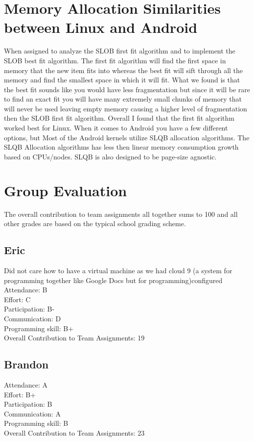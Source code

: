 \documentclass[letterpaper,10pt]{article}
\begin{document}
\section{Memory Allocation Similarities between Linux and Android}
When assigned to analyze the SLOB first fit algorithm and to implement the SLOB best fit algorithm. The first fit algorithm will find the first space in memory that the new item fits into whereas the best fit will sift through all the memory and find the smallest space in which it will fit. What we found is that the best fit sounds like you would have less fragmentation but since it will be rare to find an exact fit you will have many extremely small chunks of memory that will never be used leaving empty memory causing a higher level of fragmentation then the SLOB first fit algorithm. Overall I found that the first fit algorithm worked best for Linux. When it comes to Android you have a few different options, but Most of the Android kernels utilize SLQB allocation algorithms. The SLQB Allocation algorithms has less then linear memory consumption growth based on CPUs/nodes. SLQB is also designed to be page-size agnostic.

\newpage
\section{Group Evaluation}
The overall contribution to team assignments all together sums to 100 and all other grades are based on the typical school grading scheme. 
\subsection{Eric} 
Did not care how to have a virtual machine as we had cloud 9 (a system for programming together like Google Docs but for programming)configured\\
Attendance: B\\
Effort: C\\
Participation: B-\\
Communication: D\\
Programming skill: B+\\
Overall Contribution to Team Assignments: 19
\subsection{Brandon}
Attendance: A\\
Effort: B+\\
Participation: B\\
Communication: A\\
Programming skill: B\\
Overall Contribution to Team Assignments: 23
\end{document}
